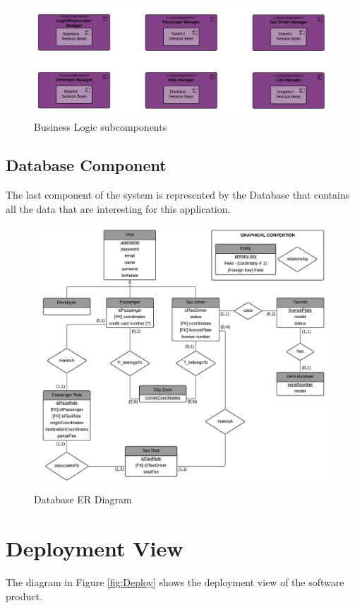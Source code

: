 \begin{figure}[htbp]
\centering
\includegraphics[width=\textwidth]{cpt/img/ServerInterfaces}
\caption{Business Logic subcomponents}
\end{figure}
\clearpage

\subsection{Database Component}
The last component of the system is represented by the Database that contains all the data that are interesting for this application.

\begin{figure}[htbp]
\centering
\includegraphics[width=\textwidth]{cpt/img/Database}
\caption{Database ER Diagram}
\end{figure}
\clearpage

\section{Deployment View}
The diagram in Figure \ref{fig:Deploy} shows the deployment view of the software product.

